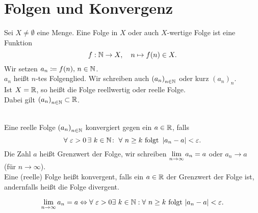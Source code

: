 \documentclass[../ana1.tex]{subfiles}
\begin{document}
\setcounter{section}{6}

\section{Folgen und Konvergenz}

\begin{defi}
	Sei \( X \neq \emptyset \) eine Menge. Eine Folge in \(X \) oder auch \(X \)-wertige Folge ist eine Funktion 
	\[ f:\mathbb{N}\rightarrow X , \quad n \mapsto f(n) \in X. \]
	Wir setzen \(a_n \coloneqq f(n) , \, n \in \mathbb{N} \).\\
	\(a_n \) heißt \(n \)-tes Folgenglied. Wir schreiben auch \({(a_n)}_{n \in \mathbb{N}}\) oder kurz \({(a_n)}_n \).\\
	Ist \(X = \mathbb{R} \), so heißt die Folge reellwertig oder reelle Folge. \\
	Dabei gilt \({(a_n)}_{n\in\mathbb{N}} \subset \mathbb{R} \).
\end{defi}

\begin{defi} \leavevmode \\
	Eine reelle Folge \({(a_n)}_{n \in \mathbb{N}} \) konvergiert gegen ein \(a \in \mathbb{R} \), falls 
	\[\forall \, \varepsilon > 0 \, \exists \, k \in \N \colon \; \forall \, n \geq k \text{ folgt } \abs{a_n - a} < \varepsilon. \]
	Die Zahl \(a\) heißt Grenzwert der Folge, wir schreiben \(\lim\limits_{n\rightarrow\infty}a_n = a\) oder \(a_n\rightarrow a\) (für \(n\rightarrow\infty \)).\\
	Eine (reelle) Folge heißt konvergent, falls ein \(a\in\mathbb{R} \) der Grenzwert der Folge ist, andernfalls heißt die Folge divergent.
\end{defi}

\begin{bem}
	\[\limes{n}a_n = a \Leftrightarrow \forall \, \varepsilon > 0 \exists \, k\in\N: \forall \, n\geq k \text{ folgt } |a_n -a|< \varepsilon.\]
\end{bem}
\end{document}
